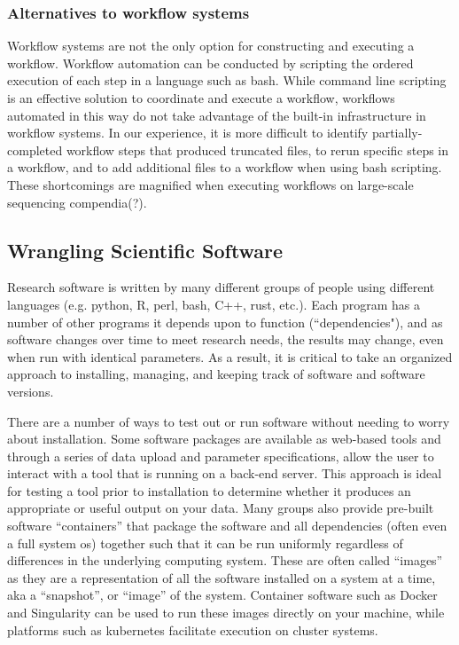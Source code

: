 \documentclass[10pt,letterpaper]{article}
\begin{document}
\subsubsection*{Alternatives to workflow systems}
Workflow systems are not the only option for constructing and executing a workflow.
Workflow automation can be conducted by scripting the ordered execution of each step in a language such as bash.
While command line scripting is an effective solution to coordinate and execute a workflow, workflows automated in this way do not take advantage of the built-in infrastructure in workflow systems.
In our experience, it is more difficult to identify partially-completed workflow steps that produced truncated files, to rerun specific steps in a workflow, and to add additional files to a workflow when using bash scripting.
These shortcomings are magnified when executing workflows on large-scale sequencing compendia(?).


\subsection*{Wrangling Scientific Software} 
Research software is written by many different groups of people using different languages (e.g. python, R, perl, bash, C++, rust, etc.). 
Each program has a number of other programs it depends upon to function (``dependencies"), and as software changes over time to meet research needs, the results may change, even when run with identical parameters. 
As a result, it is critical to take an organized approach to installing, managing, and keeping track of software and software versions. 

There are a number of ways to test out or run software without needing to worry about installation. 
Some software packages are available as web-based tools and through a series of data upload and parameter specifications, allow the user to interact with a tool that is running on a back-end server. 
This approach is ideal for testing a tool prior to installation to determine whether it produces an appropriate or useful output on your data. 
Many groups also provide pre-built software ``containers” that package the software and all dependencies (often even a full system os) together such that it can be run uniformly regardless of differences in the underlying computing system. 
These are often called ``images” as they are a representation of all the software installed on a system at a time, aka a ``snapshot”, or ``image” of the system. 
Container software such as Docker and Singularity can be used to run these images directly on your machine, while platforms such as kubernetes facilitate execution on cluster systems.
\end{document}
